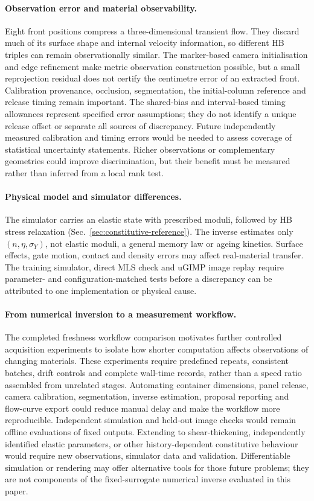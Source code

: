 \paragraph{Observation error and material observability.}
Eight front positions compress a three-dimensional transient flow.
They discard much of its surface shape and internal velocity
information, so different HB triples can remain observationally
similar. The marker-based camera initialisation and edge refinement
make metric observation construction possible, but a small
reprojection residual does not certify the centimetre error of an
extracted front. Calibration provenance, occlusion, segmentation,
the initial-column reference and release timing remain important.
The shared-bias and interval-based timing allowances represent
specified error assumptions; they do not identify a unique release
offset or separate all sources of discrepancy. Future independently
measured calibration and timing errors would be needed to assess
coverage of statistical uncertainty statements. Richer observations
or complementary geometries could improve discrimination, but their
benefit must be measured rather than inferred from a local rank test.

\paragraph{Physical model and simulator differences.}
The simulator carries an elastic state with prescribed moduli,
followed by HB stress relaxation (Sec.~\ref{sec:constitutive-reference}).
The inverse estimates only $(n,\eta,\sigma_Y)$, not elastic moduli,
a general memory law or ageing kinetics. Surface effects, gate motion,
contact and density errors may affect real-material transfer.
The training simulator, direct MLS check and uGIMP image replay
require parameter- and configuration-matched tests before a discrepancy
can be attributed to one implementation or physical cause.

\paragraph{From numerical inversion to a measurement workflow.}
The completed freshness workflow comparison motivates further
controlled acquisition experiments to isolate how shorter computation
affects observations of changing materials. These experiments require
predefined repeats, consistent batches, drift controls and complete
wall-time records, rather than a speed ratio assembled from unrelated
stages. Automating container dimensions, panel release, camera
calibration, segmentation, inverse estimation, proposal reporting
and flow-curve export could reduce manual delay and make the workflow
more reproducible. Independent simulation and held-out image checks
would remain offline evaluations of fixed outputs. Extending to
shear-thickening, independently identified elastic parameters, or
other history-dependent constitutive behaviour would require new
observations, simulator data and validation. Differentiable simulation
or rendering may offer alternative tools for those future problems;
they are not components of the fixed-surrogate numerical inverse
evaluated in this paper.

